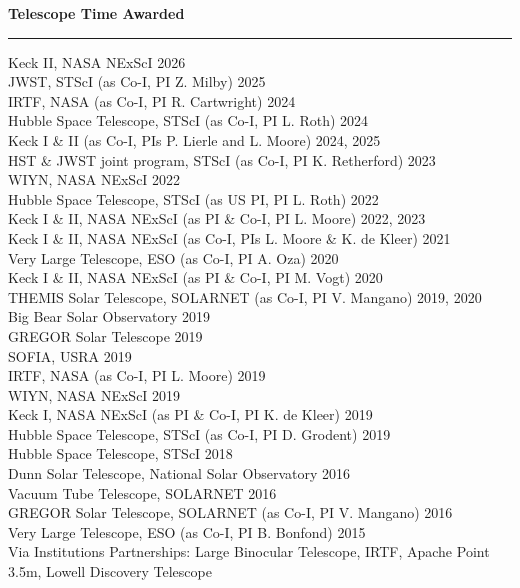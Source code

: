 \documentclass[12pt]{report}
\begin{document}
\noindent\bf{Telescope Time Awarded}\rm \hspace*{\fill} \\
\rule{\textwidth}{1pt}
Keck II, NASA NExScI \hfill 2026\\
JWST, STScI (as Co-I, PI Z. Milby) \hfill 2025\\
IRTF, NASA (as Co-I, PI R. Cartwright) \hfill 2024\\
Hubble Space Telescope, STScI (as Co-I, PI L. Roth) \hfill 2024\\
Keck I \& II (as Co-I, PIs P. Lierle and L. Moore) \hfill 2024, 2025\\
HST \& JWST joint program, STScI (as Co-I, PI K. Retherford) \hfill 2023\\
WIYN, NASA NExScI \hfill 2022\\
Hubble Space Telescope, STScI (as US PI, PI L. Roth) \hfill 2022\\
Keck I \& II, NASA NExScI (as PI \& Co-I, PI L. Moore) \hfill 2022, 2023\\
Keck I \& II, NASA NExScI (as Co-I, PIs L. Moore \& K. de Kleer) \hfill 2021\\
Very Large Telescope, ESO (as Co-I, PI A. Oza) \hfill 2020\\
Keck I \& II, NASA NExScI  (as PI \& Co-I, PI M. Vogt) \hfill 2020\\
THEMIS Solar Telescope, SOLARNET (as Co-I, PI V. Mangano) \hfill 2019, 2020\\
Big Bear Solar Observatory \hfill 2019\\
GREGOR Solar Telescope \hfill 2019\\
SOFIA, USRA \hfill 2019\\
IRTF, NASA (as Co-I, PI L. Moore) \hfill 2019\\
WIYN, NASA NExScI \hfill 2019\\
Keck I, NASA NExScI (as PI \& Co-I, PI K. de Kleer) \hfill 2019\\
Hubble Space Telescope, STScI (as Co-I, PI D. Grodent) \hfill 2019\\
Hubble Space Telescope, STScI \hfill 2018\\
Dunn Solar Telescope, National Solar Observatory \hfill 2016\\
Vacuum Tube Telescope, SOLARNET \hfill 2016\\
GREGOR Solar Telescope, SOLARNET (as Co-I, PI V. Mangano) \hfill 2016\\
Very Large Telescope, ESO (as Co-I, PI B. Bonfond) \hfill 2015\\
Via Institutions Partnerships: Large Binocular Telescope, IRTF, Apache Point 3.5m, Lowell Discovery Telescope\\
\end{document}
